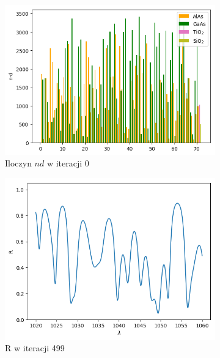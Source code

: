 \begin{figure} [H]
\begin{subfigure}[b]{0.32\textwidth}
        \includegraphics[width=\linewidth]{figures/wyniki/losowe/d/result_ndresult0.png}
        \caption{Iloczyn $nd$ w iteracji 0}
    \end{subfigure}
        \begin{subfigure}[b]{0.30\textwidth}
        \includegraphics[width=\linewidth]{figures/wyniki/losowe/d/result_Rresult499.png}
        \caption{R w iteracji 499}
    \end{subfigure}
        \begin{subfigure}[b]{0.31\textwidth}

\end{subfigure}
\end{figure}
